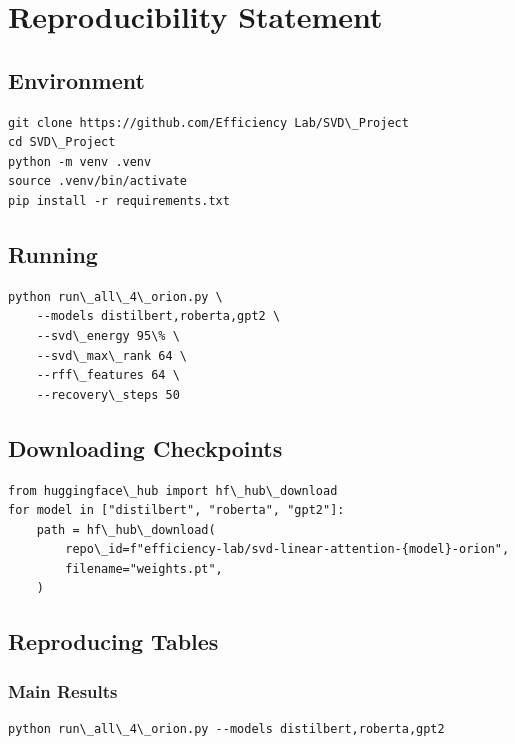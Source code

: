 
\section{Reproducibility Statement}

\subsection{Environment}

\begin{lstlisting}
git clone https://github.com/Efficiency Lab/SVD\_Project
cd SVD\_Project
python -m venv .venv
source .venv/bin/activate
pip install -r requirements.txt
\end{lstlisting}

\subsection{Running}

\begin{lstlisting}
python run\_all\_4\_orion.py \
    --models distilbert,roberta,gpt2 \
    --svd\_energy 95\% \
    --svd\_max\_rank 64 \
    --rff\_features 64 \
    --recovery\_steps 50
\end{lstlisting}

\subsection{Downloading Checkpoints}

\begin{lstlisting}
from huggingface\_hub import hf\_hub\_download
for model in ["distilbert", "roberta", "gpt2"]:
    path = hf\_hub\_download(
        repo\_id=f"efficiency-lab/svd-linear-attention-{model}-orion",
        filename="weights.pt",
    )
\end{lstlisting}

\subsection{Reproducing Tables}

\subsubsection{Main Results}

\begin{lstlisting}
python run\_all\_4\_orion.py --models distilbert,roberta,gpt2
\end{lstlisting}

